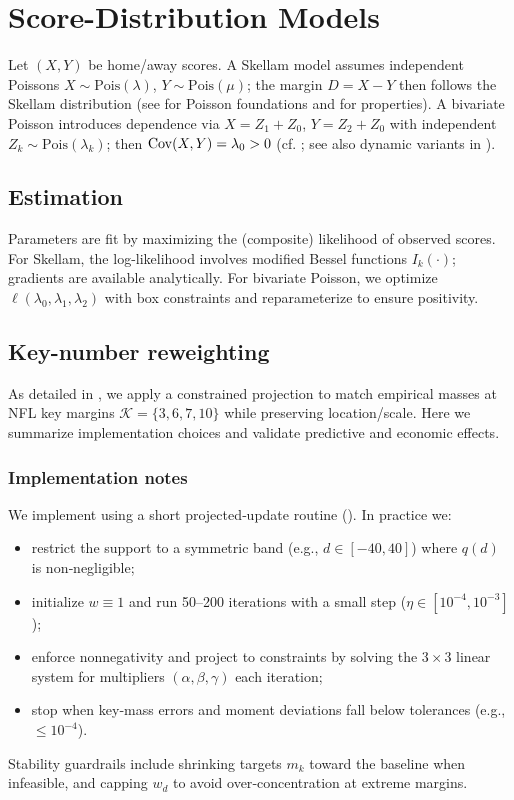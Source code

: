 \section{Score-Distribution Models}
Let $(X,Y)$ be home/away scores. A Skellam model assumes independent Poissons $X\sim\mathrm{Pois}(\lambda)$, $Y\sim\mathrm{Pois}(\mu)$; the margin $D=X-Y$ then follows the Skellam distribution (see  for Poisson foundations and  for properties). A bivariate Poisson introduces dependence via $X=Z_1+Z_0$, $Y=Z_2+Z_0$ with independent $Z_k\sim\mathrm{Pois}(\lambda_k)$; then $\mathrm{Cov}(X,Y)=\lambda_0>0$ (cf. ; see also dynamic variants in ).

\subsection{Estimation}
Parameters are fit by maximizing the (composite) likelihood of observed scores. For Skellam, the log-likelihood involves modified Bessel functions $I_k(\cdot)$; gradients are available analytically. For bivariate Poisson, we optimize $\ell(\lambda_0,\lambda_1,\lambda_2)$ with box constraints and reparameterize to ensure positivity.

\subsection{Key-number reweighting}
As detailed in , we apply a constrained projection to match empirical masses at NFL key margins $\mathcal{K}=\{3,6,7,10\}$ while preserving location/scale. Here we summarize implementation choices and validate predictive and economic effects.

\subsubsection*{Implementation notes}
We implement  using a short projected‑update routine (). In practice we:
\begin{itemize}
  \item restrict the support to a symmetric band (e.g., $d\in[-40,40]$) where $q(d)$ is non‑negligible;
  \item initialize $w\equiv 1$ and run 50–200 iterations with a small step (\(\eta\in[10^{-4},10^{-3}]\));
  \item enforce nonnegativity and project to constraints by solving the $3\times 3$ linear system for multipliers $(\alpha,\beta,\gamma)$ each iteration;
  \item stop when key‑mass errors and moment deviations fall below tolerances (e.g., $\le 10^{-4}$).
\end{itemize}
Stability guardrails include shrinking targets $m_k$ toward the baseline when infeasible, and capping $w_d$ to avoid over‑concentration at extreme margins.

